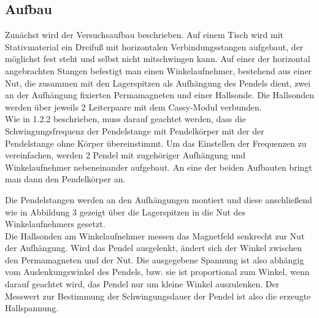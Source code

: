 \documentclass[a4paper, 11pt]{article}
\begin{document}
\subsection{Aufbau}
Zunächst wird der Versuchsaufbau beschrieben. Auf einem Tisch wird mit Stativmaterial ein Dreifuß mit horizontalen Verbindungsstangen aufgebaut, der möglichst fest steht und selbst nicht mitschwingen kann. Auf einer der horizontal angebrachten Stangen befestigt man einen Winkelaufnehmer, bestehend aus einer Nut, die zusammen mit den Lagerspitzen als Aufhängung des Pendels dient, zwei an der Aufhängung fixierten Permamagneten und einer Hallsonde. Die Hallsonden werden über jeweils 2 Leiterpaare mit dem Cassy-Modul verbunden.\\


Wie in 1.2.2 beschrieben, muss darauf geachtet werden, dass die Schwingungsfrequenz der Pendelstange mit Pendelkörper mit der der Pendelstange ohne Körper übereinstimmt. Um das Einstellen der Frequenzen zu vereinfachen, werden 2 Pendel mit zugehöriger Aufhängung und Winkelaufnehmer nebeneinander aufgebaut. An eine der beiden Aufbauten bringt man dann den Pendelkörper an.
\newpage

Die Pendelstangen werden an den Aufhängungen montiert und diese anschließend wie in Abbildung 3 gezeigt über die Lagerspitzen in die Nut des Winkelaufnehmers gesetzt.\\


Die Hallsonden am Winkelaufnehmer messen das Magnetfeld senkrecht zur Nut der Aufhängung. Wird das Pendel ausgelenkt, ändert sich der Winkel zwischen den Permamagneten und der Nut. Die ausgegebene Spannung ist also abhängig vom Auslenkungswinkel des Pendels, bzw. sie ist proportional zum Winkel, wenn darauf geachtet wird, das Pendel nur um kleine Winkel auszulenken. Der Messwert zur Bestimmung der Schwingungsdauer der Pendel ist also die erzeugte Hallspannung.\\
\end{document}

